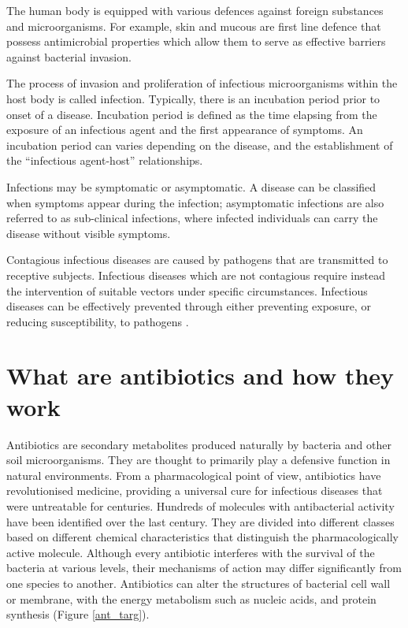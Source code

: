 \documentclass[11pt]{report}
\begin{document}
The human body is equipped with various defences against foreign substances and microorganisms. For example, skin and mucous are first line defence that possess antimicrobial properties which allow them to serve as effective barriers against bacterial invasion.

The process of invasion and proliferation of infectious microorganisms within the host body is called infection. Typically, there is an incubation period prior to onset of a disease. Incubation period is defined as the time elapsing from the exposure of an infectious agent and the first appearance of symptoms. An incubation period can varies depending on the disease, and the establishment of the “infectious agent-host” relationships.

Infections may be symptomatic or asymptomatic. A disease can be classified when symptoms appear during the infection; asymptomatic infections are also referred to as sub-clinical infections, where infected individuals can carry the disease without visible symptoms.

Contagious infectious diseases are caused by pathogens that are transmitted to receptive subjects.
Infectious diseases which are not contagious require instead the intervention of suitable vectors under specific circumstances.
Infectious diseases can be effectively prevented through either preventing exposure, or reducing susceptibility, to pathogens \cite{EPICentro}.

\chapter{What are antibiotics and how they work}
Antibiotics are secondary metabolites produced naturally by bacteria and other soil microorganisms.
They are thought to primarily play a defensive function in natural environments.
From a pharmacological point of view, antibiotics have revolutionised medicine, providing a universal cure for infectious diseases that were untreatable for centuries.
Hundreds of molecules with antibacterial activity have been identified over the last century. They are divided into different classes based on different chemical characteristics that distinguish the pharmacologically active molecule.
Although every antibiotic interferes with the survival of the bacteria at various levels, their mechanisms of action may differ significantly from one species to another.
Antibiotics can alter the structures of bacterial cell wall or membrane, with the energy metabolism such as nucleic acids, and protein synthesis (Figure \ref{ant_targ}).
\end{document}
